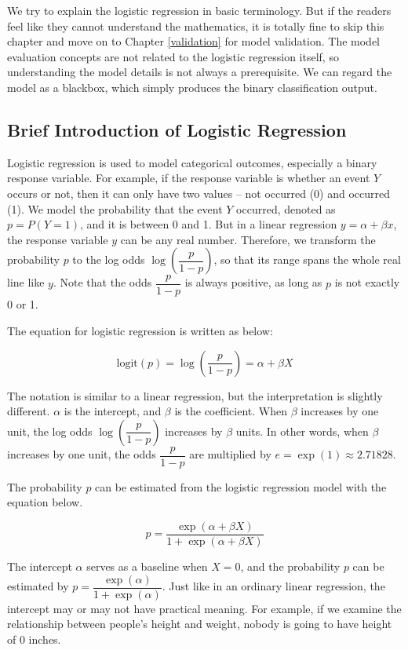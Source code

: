 \documentclass[
]{article}
\begin{document}
We try to explain the logistic regression in basic terminology. But if
the readers feel like they cannot understand the mathematics, it is
totally fine to skip this chapter and move on to Chapter
\ref{validation} for model validation. The model evaluation concepts are
not related to the logistic regression itself, so understanding the
model details is not always a prerequisite. We can regard the model as a
blackbox, which simply produces the binary classification output.

\hypertarget{logit-intro}{%
\subsection{Brief Introduction of Logistic
Regression}\label{logit-intro}}

Logistic regression is used to model categorical outcomes, especially a
binary response variable. For example, if the response variable is
whether an event \(Y\) occurs or not, then it can only have two values
-- not occurred (0) and occurred (1). We model the probability that the
event \(Y\) occurred, denoted as \(p = P(Y = 1)\), and it is between 0
and 1. But in a linear regression \(y = \alpha + \beta x\), the response
variable \(y\) can be any real number. Therefore, we transform the
probability \(p\) to the log odds \(\log (\dfrac{p}{1-p})\), so that its
range spans the whole real line like \(y\). Note that the odds
\(\dfrac{p}{1-p}\) is always positive, as long as \(p\) is not exactly 0
or 1.

The equation for logistic regression is written as below:

\[\text{logit}(p) = \log (\dfrac{p}{1-p}) = \alpha + \beta X\]

The notation is similar to a linear regression, but the interpretation
is slightly different. \(\alpha\) is the intercept, and \(\beta\) is the
coefficient. When \(\beta\) increases by one unit, the log odds
\(\log (\dfrac{p}{1-p})\) increases by \(\beta\) units. In other words,
when \(\beta\) increases by one unit, the odds \(\dfrac{p}{1-p}\) are
multiplied by \(e = \exp(1) \approx 2.71828\).

The probability \(p\) can be estimated from the logistic regression
model with the equation below.

\[p = \dfrac{\exp(\alpha+\beta X)}{1 + \exp(\alpha+\beta X)}\]

The intercept \(\alpha\) serves as a baseline when \(X = 0\), and the
probability \(p\) can be estimated by
\(p = \dfrac{\exp(\alpha)}{1 + \exp(\alpha)}\). Just like in an ordinary
linear regression, the intercept may or may not have practical meaning.
For example, if we examine the relationship between people's height and
weight, nobody is going to have height of 0 inches.
\end{document}
